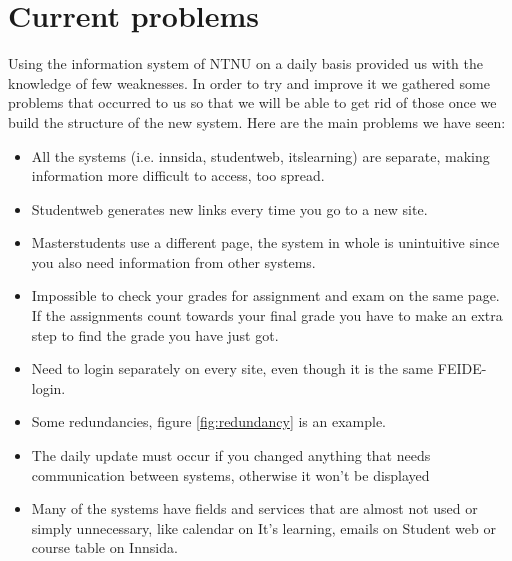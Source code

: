 \section{Current problems}

Using the information system of NTNU on a daily basis provided us with the knowledge of few weaknesses. In order to try and improve it we gathered some problems that occurred to us so that we will be able to get rid of those once we build the structure of the new system. Here are the main problems we have seen:
\begin{itemize}

\item{All the systems (i.e. innsida, studentweb, itslearning) are separate, making information more difficult to access, too spread.}
\item{Studentweb generates new links every time you go to a new site.}
\item{Masterstudents use a different page, the system in whole is unintuitive since you also need information from other systems.}
\item{Impossible to check your grades for assignment and exam on the same page. If the assignments count towards your final grade you have to make an extra step to find the grade you have just got.}
\item{Need to login separately on every site, even though it is the same FEIDE-login.}
\item{Some redundancies, figure {\ref{fig:redundancy}} is an example.}
\item{The daily update must occur if you changed anything that needs communication between systems, otherwise it won't be displayed}
\item{Many of the systems have fields and services that are almost not used or simply unnecessary, like calendar on It's learning, emails on Student web or course table on Innsida. }
\end{itemize}

